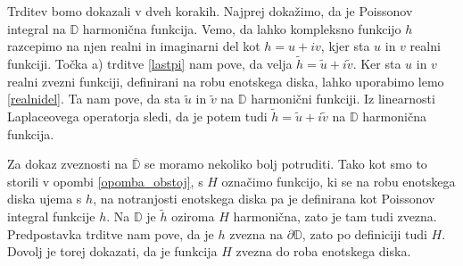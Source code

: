 \documentclass[mat1, tisk]{fmfdelo}
\begin{document}
     \begin{dokaz}
        Trditev bomo dokazali v dveh korakih. Najprej dokažimo, da je Poissonov integral na $\mathbb{D}$ harmonična funkcija.
        Vemo, da lahko kompleksno funkcijo $h$ razcepimo na njen realni in imaginarni del kot $h = u + iv$, kjer sta $u$ in $v$ realni funkciji. 
        Točka a) trditve \ref{lastpi} nam pove, da velja $\widetilde{h} = \widetilde{u} + i \widetilde{v}$.
        Ker sta $u$ in $v$ realni zvezni funkciji, definirani na robu enotskega diska, lahko uporabimo lemo \ref{realnidel}. Ta nam pove, da sta $\widetilde{u}$ in $\widetilde{v}$ na $\mathbb{D}$ harmonični funkciji. 
        Iz linearnosti Laplaceovega operatorja sledi, da je potem tudi $\widetilde{h} = \widetilde{u} + i \widetilde{v}$ na $\mathbb{D}$ harmonična funkcija.
        
        Za dokaz zveznosti na $\overline{\mathbb{D}}$ se moramo nekoliko bolj potruditi. Tako kot smo to storili v opombi \ref{opomba_obstoj}, s $H$ označimo funkcijo, ki se na robu enotskega diska ujema s $h$, na notranjosti enotskega diska pa je definirana kot Poissonov integral funkcije $h$. 
        Na  $\mathbb{D}$ je $\widetilde{h}$ oziroma $H$ harmonična, zato je tam tudi zvezna. Predpostavka trditve nam pove, da je $h$ zvezna na $\partial \mathbb{D}$, zato po definiciji tudi $H$. 
        Dovolj je torej dokazati, da je funkcija $H$ zvezna do roba enotskega diska.
        

\end{dokaz}
\end{document}
